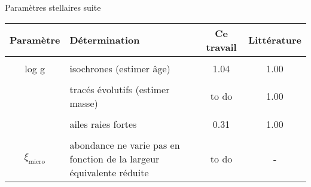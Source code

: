 \documentclass[10pt]{beamer}
\begin{document}
\begin{frame}[fragile]{Paramètres stellaires suite}







\begin{table}[h!]
    \begin{center}
        \begin{tabularx}{\textwidth}{c|X|c|c}
            Paramètre & Détermination & Ce travail& Littérature \\
            \hline
            &&\\
            log g & isochrones (estimer âge) & 1.04 & 1.00 \\
            &&\\
            & tracés évolutifs (estimer masse) & to do & 1.00 \\
            &&\\
            & ailes raies fortes & 0.31 & 1.00 \\
             &&\\
            $\xi_{\text{micro}}$ & abondance ne varie pas en fonction de la largeur équivalente réduite & to do & - \\
        \end{tabularx}
    \end{center}
\end{table}

\end{frame}
\end{document}
